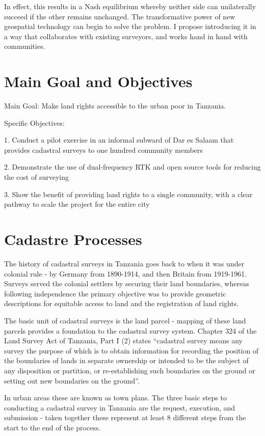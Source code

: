 \documentclass[a4paper,12pt,twoside]{article}
\begin{document}
In effect, this results in a Nash equilibrium whereby neither side can unilaterally succeed if the other remains unchanged. The transformative power of new geospatial technology can begin to solve the problem. I propose introducing it in a way that collaborates with existing surveyors, and works hand in hand with communities. 


\section{Main Goal and Objectives}
Main Goal: Make land rights accessible to the urban poor in Tanzania. 
\bigskip

Specific Objectives:
\bigskip

1. Conduct a pilot exercise in an informal subward of Dar es Salaam that provides cadastral surveys to one hundred community members
\medskip

2. Demonstrate the use of dual-frequency RTK and open source tools for reducing the cost of surveying
\medskip

3. Show the benefit of providing land rights to a single community, with a clear pathway to scale the project for the entire city
\medskip


\section{Cadastre Processes}

The history of cadastral surveys in Tanzania goes back to when it was under colonial rule - by Germany from 1890-1914, and then Britain from 1919-1961. Surveys served the colonial settlers by securing their land boundaries, whereas following independence the primary objective was to provide geometric descriptions for equitable access to land and the registration of land rights.
\bigskip

The basic unit of cadastral surveys is the land parcel - mapping of these land parcels provides a foundation to the cadastral survey system.  Chapter 324 of the Land Survey Act of Tanzania, Part I (2) states “cadastral survey means any survey the purpose of which is to obtain information for recording the position of the boundaries of lands in separate ownership or intended to be the subject of any disposition or partition, or re-establishing such boundaries on the ground or setting out new boundaries on the ground”.
\bigskip

In urban areas these are known as town plans. The three basic steps to conducting a cadastral survey in Tanzania are the request, execution, and submission - taken together these represent at least 8 different steps from the start to the end of the process. 
\bigskip
\end{document}
